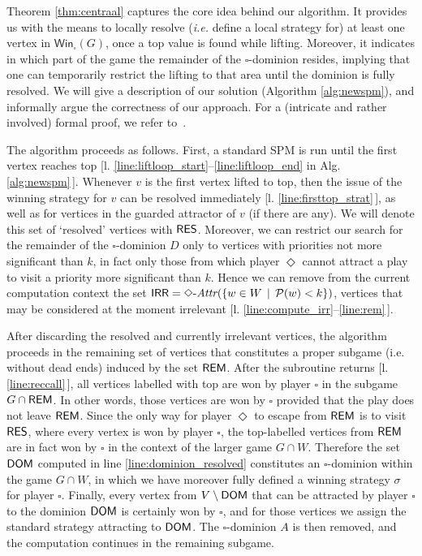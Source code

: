 \documentclass{eptcs}
\newcommand{\odd}{\ensuremath{\square}\xspace}
\newcommand{\even}{\ensuremath{\Diamond}\xspace}
\newcommand{\attrsym}{\ensuremath{\textit{Attr}}}
\newcommand{\myattr}[3]{\ensuremath{{#2}{\text{-}}\attrsym^{#1}(#3)}}
\newcommand{\winsubodd}[1]{\textsf{Win}_{\odd}(#1)}
\newcommand{\ie}{\emph{i.e.}\xspace}
\newcommand{\priosym}{\mathcal{P}}
\newcommand{\prio}[1]{\priosym(#1)}
\begin{document}
\newcommand{\genlift}[3]{\ensuremath{\text{lift}_{#1}(#2,#3)}}
\def\genliftname{\text{lift}_{W}}

Theorem \ref{thm:centraal} captures the core idea behind our algorithm.
It provides us with the means to locally resolve (\ie define a local
strategy for) at least one vertex in $\winsubodd{G}$, once a top value
is found while lifting. Moreover, it indicates in which part of
the game the remainder of the \odd-dominion resides, implying
that one can temporarily restrict the lifting to that area until
the dominion is fully resolved. 
We will give a description of our solution (Algorithm \ref{alg:newspm}), and
informally argue the correctness of our approach.  For a (intricate and rather involved) formal proof, we
refer to~\cite{GW:14}.

The algorithm proceeds as follows. First, a standard SPM is run until the first vertex reaches top [l. \ref{line:liftloop_start}--\ref{line:liftloop_end} in Alg. \ref{alg:newspm}\,]. Whenever $v$ is the first vertex lifted to top, then the issue of the winning strategy for $v$ can be resolved immediately [l. \ref{line:firsttop_strat}\,], as well as for vertices in the guarded attractor of $v$ (if there are any). We will denote this set of `resolved' vertices with $\textsf{RES}$. Moreover, we can restrict our search for the remainder of the \odd-dominion $D$ only to vertices with priorities not more significant than $k$, in fact only those from which player \even cannot attract a play to visit a priority more significant than $k$. Hence we can remove from the current computation context the set $\irr = \myattr{}{\even}{\{ w \in W \,\mid\, \prio{w} < k\}}$, vertices that may be considered at the moment irrelevant [l. \ref{line:compute_irr}--\ref{line:rem}\,].

After discarding the resolved and currently irrelevant vertices, the algorithm proceeds in the remaining set of vertices that constitutes a proper subgame (i.e. without dead ends) induced by the set $\textsf{REM}$. After the subroutine returns [l. \ref{line:reccall}\,], all vertices labelled with top are won by player \odd in the subgame $G \cap \textsf{REM}$. In other words, those vertices are won by \odd provided that the play does not leave $\textsf{REM}$. Since the only way for player \even to escape from $\textsf{REM}$ is to visit $\textsf{RES}$, where every vertex is won by player \odd, the top-labelled vertices from $\textsf{REM}$ are in fact won by \odd in the context of the larger game $G \cap W$. Therefore the set $\textsf{DOM}$ computed in line \ref{line:dominion_resolved} constitutes an \odd-dominion within the game $G \cap W$, in which we have moreover fully defined a winning strategy $\sigma$ for player \odd. Finally, every vertex from $V \setminus \textsf{DOM}$ that can be attracted by player \odd to the dominion $\textsf{DOM}$ is certainly won by \odd, and for those vertices we assign the standard strategy attracting to $\textsf{DOM}$. The \odd-dominion $A$ is then removed, and the computation continues in the remaining subgame. 
\medskip
\end{document}
